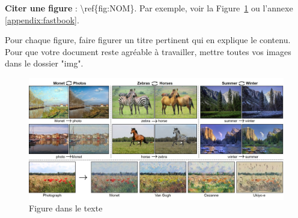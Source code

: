 \documentclass[12pt]{article} 	%
\begin{document}
{\textbf{Citer une figure} : \textbackslash ref\{fig:NOM\}. Par exemple, voir la
Figure~\ref{fig:gan} ou l'annexe \ref{appendix:fastbook}. 

Pour chaque figure, faire figurer un titre pertinent qui en explique le contenu. Pour que votre document reste agréable à travailler, mettre toutes vos images dans le dossier "img".

\begin{figure}[!h]
    \begin{center}
        \includegraphics[scale=0.4]{img/gan_img.jpg}
    \end{center}
    \caption{Figure dans le texte~\cite{CycleGAN2017}}
    \label{fig:gan}
\end{figure}
}
\newpage
\appendix
\end{document}

